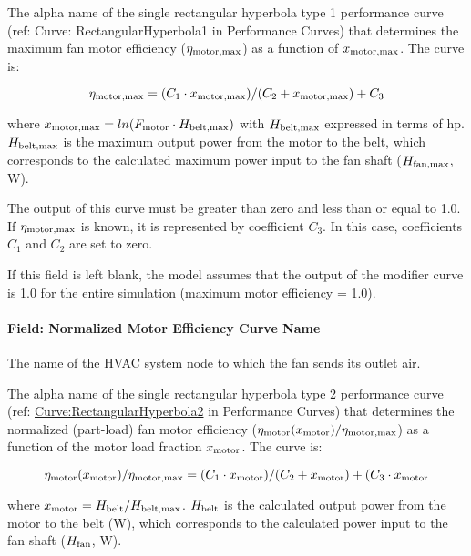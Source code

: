 The alpha name of the single rectangular hyperbola type 1 performance curve (ref: Curve: RectangularHyperbola1 in Performance Curves) that determines the maximum fan motor efficiency (\(\eta_{\rm{motor, max}}\)) as a function of \(x_{\rm{motor, max}}\). The curve is:

\begin{equation}
  \eta_{\rm{motor, max}} = (C_1 \cdot x_{\rm{motor, max}}) / (C_2 + x_{\rm{motor, max}}) + C_3
\end{equation}

where \(x_{\rm{motor, max}} = ln(F_{\rm{motor}} \cdot H_{\rm{belt, max}})\) with \(H_{\rm{belt, max}}\) expressed in terms of hp. \(H_{\rm{belt, max}}\) is the maximum output power from the motor to the belt, which corresponds to the calculated maximum power input to the fan shaft (\(H_{\rm{fan, max}}\), W).

The output of this curve must be greater than zero and less than or equal to 1.0. If \(\eta_{\rm{motor, max}}\) is known, it is represented by coefficient \(C_3\). In this case, coefficients \(C_1\) and \(C_2\) are set to zero.

If this field is left blank, the model assumes that the output of the modifier curve is 1.0 for the entire simulation (maximum motor efficiency = 1.0).

\paragraph{Field: Normalized Motor Efficiency Curve Name}\label{field-normalized-motor-efficiency-curve-name}

The name of the HVAC system node to which the fan sends its outlet air.

The alpha name of the single rectangular hyperbola type 2 performance curve (ref: \hyperref[curverectangularhyperbola2]{Curve:RectangularHyperbola2} in Performance Curves) that determines the normalized (part-load) fan motor efficiency (\(\eta_{\rm{motor}} (x_{\rm{motor}}) /  \eta_{\rm{motor, max}}\)) as a function of the motor load fraction \(x_{\rm{motor}}\). The curve is:

\begin{equation}
  \eta_{\rm{motor}} (x_{\rm{motor}}) / \eta_{\rm{motor, max}} = (C_1 \cdot x_{\rm{motor}}) / (C_2 + x_{\rm{motor}}) + (C_3 \cdot x_{\rm{motor}}
\end{equation}

where \(x_{\rm{motor}} = H_{\rm{belt}} / H_{\rm{belt, max}}\). \(H_{\rm{belt}}\) is the calculated output power from the motor to the belt (W), which corresponds to the calculated power input to the fan shaft (\(H_{\rm{fan}}\), W).

